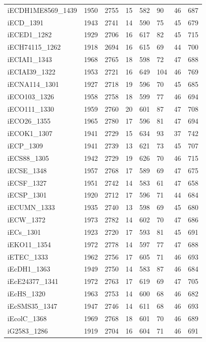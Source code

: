\documentclass[11pt, a4paper]{article}
\begin{document}
\begin{table}[!htbp]
{\begin{tabular}{|l|l|l|l|l|l|l|l|}
	iECDH1ME8569\_1439 & 1950 & 2755 & 15 & 582 & 90 & 46 & 687 \\
	iECD\_1391 & 1943 & 2741 & 14 & 590 & 75 & 45 & 679 \\
	iECED1\_1282 & 1929 & 2706 & 16 & 617 & 82 & 45 & 715 \\
	iECH74115\_1262 & 1918 & 2694 & 16 & 615 & 69 & 44 & 700 \\
	iECIAI1\_1343 & 1968 & 2765 & 18 & 598 & 72 & 47 & 688 \\
	iECIAI39\_1322 & 1953 & 2721 & 16 & 649 & 104 & 46 & 769 \\
	iECNA114\_1301 & 1927 & 2718 & 19 & 596 & 70 & 45 & 685 \\
	iECO103\_1326 & 1958 & 2758 & 18 & 599 & 77 & 46 & 694 \\
	iECO111\_1330 & 1959 & 2760 & 20 & 601 & 87 & 47 & 708 \\
	iECO26\_1355 & 1965 & 2780 & 17 & 596 & 81 & 47 & 694 \\
	iECOK1\_1307 & 1941 & 2729 & 15 & 634 & 93 & 37 & 742 \\
	iECP\_1309 & 1941 & 2739 & 13 & 621 & 73 & 45 & 707 \\
	iECS88\_1305 & 1942 & 2729 & 19 & 626 & 70 & 46 & 715 \\
	iECSE\_1348 & 1957 & 2768 & 17 & 589 & 69 & 47 & 675 \\
	iECSF\_1327 & 1951 & 2742 & 14 & 583 & 61 & 47 & 658 \\
	iECSP\_1301 & 1920 & 2712 & 17 & 596 & 71 & 44 & 684 \\
	iECUMN\_1333 & 1935 & 2740 & 13 & 598 & 69 & 45 & 680 \\
	iECW\_1372 & 1973 & 2782 & 14 & 602 & 70 & 47 & 686 \\
	iECs\_1301 & 1923 & 2720 & 17 & 593 & 81 & 45 & 691 \\
	iEKO11\_1354 & 1972 & 2778 & 14 & 597 & 77 & 47 & 688 \\
	iETEC\_1333 & 1962 & 2756 & 17 & 605 & 71 & 46 & 693 \\
	iEcDH1\_1363 & 1949 & 2750 & 14 & 583 & 87 & 46 & 684 \\
	iEcE24377\_1341 & 1972 & 2763 & 17 & 619 & 69 & 47 & 705 \\
		iEcHS\_1320 & 1963 & 2753 & 14 & 600 & 68 & 46 & 682 \\
	iEcSMS35\_1347 & 1947 & 2746 & 14 & 611 & 68 & 46 & 693 \\
	iEcolC\_1368 & 1969 & 2768 & 18 & 601 & 70 & 46 & 689 \\
	iG2583\_1286 & 1919 & 2704 & 16 & 604 & 71 & 46 & 691 \\

\end{tabular}}
\end{table}
\end{document}
